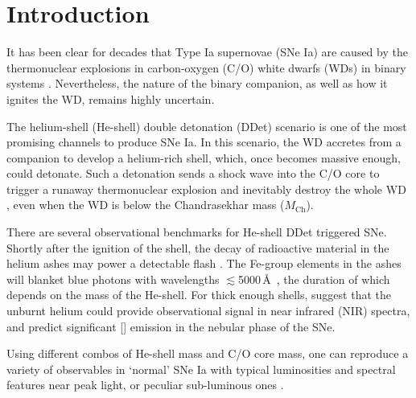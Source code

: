 \documentclass[twocolumn]{aastex631}
\newcommand{\Mch}{$M_\mathrm{Ch}$}
\begin{document}
\section{Introduction} \label{sec:intro}
It has been clear for decades that Type Ia supernovae (SNe Ia) are caused by the thermonuclear explosions in carbon-oxygen (C/O) white dwarfs (WDs) in binary systems \citep[see][for a review]{Maoz_2014}. Nevertheless, the nature of the binary companion, as well as how it ignites the WD, remains highly uncertain. 

The helium-shell (He-shell) double detonation (DDet) scenario is one of the most promising channels to produce SNe Ia. In this scenario, the WD accretes from a companion to develop a helium-rich shell, which, once becomes massive enough, could detonate. Such a detonation sends a shock wave into the C/O core to trigger a runaway thermonuclear explosion and inevitably destroy the whole WD \citep{Nomoto_1982a, Nomoto_1982b, Woosley_1986, Livne_1990, Woosley_1994, Livne_1995}, even when the WD is below the Chandrasekhar mass (\Mch).

There are several observational benchmarks for He-shell DDet triggered SNe. Shortly after the ignition of the shell, the decay of radioactive material in the helium ashes may power a detectable flash \citep{Woosley_1994,Fink_DD_2010,Kromer_DD_2010}. The Fe-group elements in the ashes will blanket blue photons with wavelengths $\lesssim$5000\,\AA\ \citep{Kromer_DD_2010}, the duration of which depends on the mass of the He-shell. For thick enough shells, \citet{Boyle2017_Helium} suggest that the unburnt helium could provide observational signal in near infrared (NIR) spectra, and \citet{polin_nebular_2021} predict significant [] emission in the nebular phase of the SNe.

Using different combos of He-shell mass and C/O core mass, one can reproduce a variety of observables in `normal' SNe Ia with typical luminosities and spectral features near peak light, or peculiar sub-luminous ones \citep{polin_observational_2019}. 
\end{document}
